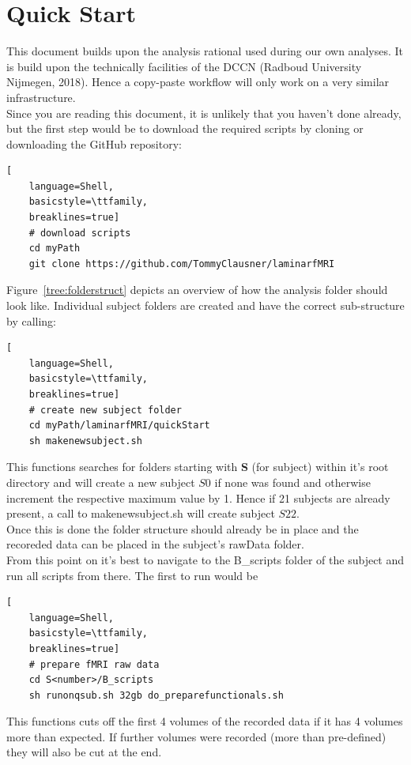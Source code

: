 \documentclass[12pt,a4paper]{scrartcl}
\begin{document}
\FloatBarrier

\section{Quick Start}
This document builds upon the analysis rational used during our own analyses. It is build upon the technically facilities of the DCCN (Radboud University Nijmegen, 2018). Hence a copy-paste workflow will only work on a very similar infrastructure.\\
Since you are reading this document, it is unlikely that you haven't done already, but the first step would be to download the required scripts by cloning or downloading the GitHub repository:
\begin{lstlisting}[
    language=Shell,
    basicstyle=\ttfamily,
    breaklines=true]
    # download scripts
    cd myPath
    git clone https://github.com/TommyClausner/laminarfMRI
\end{lstlisting}
Figure~\ref{tree:folderstruct} depicts an overview of how the analysis folder should look like. Individual subject folders are created and have the correct sub-structure by calling:
\begin{lstlisting}[
    language=Shell,
    basicstyle=\ttfamily,
    breaklines=true]
    # create new subject folder
    cd myPath/laminarfMRI/quickStart
    sh makenewsubject.sh
 \end{lstlisting}
This functions searches for folders starting with \textbf{S} (for subject) within it's root directory and will create a new subject $S0$ if none was found and otherwise increment the respective maximum value by 1. Hence if 21 subjects are already present, a call to makenewsubject.sh will create subject $S22$.\\
Once this is done the folder structure should already be in place and the recoreded data can be placed in the subject's rawData folder.\\
From this point on it's best to navigate to the B\_scripts folder of the subject and run all scripts from there. The first to run would be
\begin{lstlisting}[
    language=Shell,
    basicstyle=\ttfamily,
    breaklines=true]
    # prepare fMRI raw data
    cd S<number>/B_scripts
    sh runonqsub.sh 32gb do_preparefunctionals.sh
\end{lstlisting}
This functions cuts off the first 4 volumes of the recorded data if it has 4 volumes more than expected. If further volumes were recorded (more than pre-defined) they will also be cut at the end.
\end{document}
